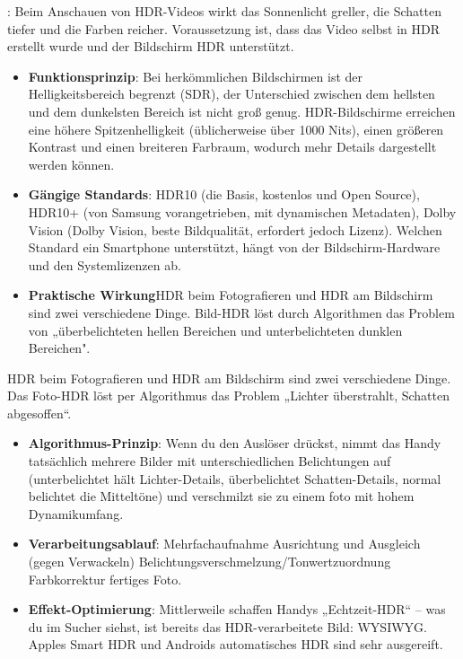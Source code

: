 
: Beim Anschauen von HDR-Videos wirkt das Sonnenlicht greller, die Schatten tiefer und die Farben reicher. Voraussetzung ist, dass das Video selbst in HDR erstellt wurde und der Bildschirm HDR unterstützt.

\begin{itemize}
  \item \textbf{Funktionsprinzip}: Bei herkömmlichen Bildschirmen ist der Helligkeitsbereich begrenzt (SDR), der Unterschied zwischen dem hellsten und dem dunkelsten Bereich ist nicht groß genug. HDR-Bildschirme erreichen eine höhere Spitzenhelligkeit (üblicherweise über 1000 Nits), einen größeren Kontrast und einen breiteren Farbraum, wodurch mehr Details dargestellt werden können.
  \item \textbf{Gängige Standards}: HDR10 (die Basis, kostenlos und Open Source), HDR10+ (von Samsung vorangetrieben, mit dynamischen Metadaten), Dolby Vision (Dolby Vision, beste Bildqualität, erfordert jedoch Lizenz). Welchen Standard ein Smartphone unterstützt, hängt von der Bildschirm-Hardware und den Systemlizenzen ab.
  \item \textbf{Praktische Wirkung}HDR beim Fotografieren und HDR am Bildschirm sind zwei verschiedene Dinge. Bild-HDR löst durch Algorithmen das Problem von „überbelichteten hellen Bereichen und unterbelichteten dunklen Bereichen".
\end{itemize}


HDR beim Fotografieren und HDR am Bildschirm sind zwei verschiedene Dinge. Das Foto-HDR löst per Algorithmus das Problem „Lichter überstrahlt, Schatten abgesoffen“.

\begin{itemize}
  \item \textbf{Algorithmus-Prinzip}: Wenn du den Auslöser drückst, nimmt das Handy tatsächlich mehrere Bilder mit unterschiedlichen Belichtungen auf (unterbelichtet hält Lichter-Details, überbelichtet Schatten-Details, normal belichtet die Mitteltöne) und verschmilzt sie zu einem foto mit hohem Dynamikumfang.
  \item \textbf{Verarbeitungsablauf}: Mehrfachaufnahme Ausrichtung und Ausgleich (gegen Verwackeln) Belichtungsverschmelzung/Tonwertzuordnung Farbkorrektur fertiges Foto.
  \item \textbf{Effekt-Optimierung}: Mittlerweile schaffen Handys „Echtzeit-HDR“ – was du im Sucher siehst, ist bereits das HDR-verarbeitete Bild: WYSIWYG. Apples Smart HDR und Androids automatisches HDR sind sehr ausgereift.
\end{itemize}

